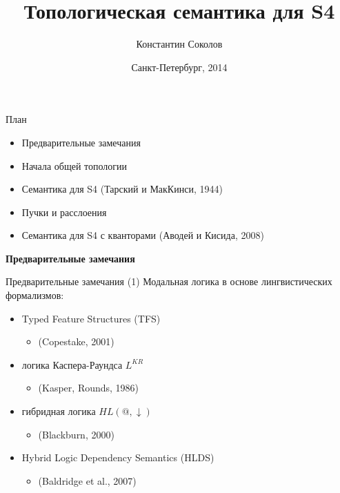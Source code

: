\documentclass{beamer}
\begin{document}
\title{\Large{Топологическая семантика для S4}}
\author{Константин Соколов}
\date{Санкт-Петербург, 2014} 
\begin{frame}
    \thispagestyle{empty}
    \titlepage
\end{frame}

\begin{frame}{План}
    \setcounter{framenumber}{1}
    \begin{itemize}
    	\item Предварительные замечания
        \item Начала общей топологии
        \item Семантика для S4 (Тарский и МакКинси, 1944)
        \item Пучки и расслоения
        \item Семантика для S4 с кванторами (Аводей и Кисида, 2008)
    \end{itemize}
\end{frame}

\begin{frame}{}
\begin{center}
	\textbf{Предварительные замечания}
\end{center}
\end{frame}

\begin{frame}{Предварительные замечания (1)}
Модальная логика в основе лингвистических формализмов:\\
\bigskip
\begin{itemize}
	\item Typed Feature Structures (TFS)
		\begin{itemize}
			\item (Copestake, 2001) 
		\end{itemize}
	\item логика Каспера-Раундса $L^{KR}$
		\begin{itemize}
			\item (Kasper, Rounds, 1986)
		\end{itemize}
	\item гибридная логика $HL(@, \downarrow)$
		\begin{itemize}
			\item (Blackburn, 2000)
		\end{itemize}
	\item Hybrid Logic Dependency Semantics (HLDS)
		\begin{itemize}
			\item (Baldridge et al., 2007)
		\end{itemize}
\end{itemize}
\end{frame}
\end{document}
